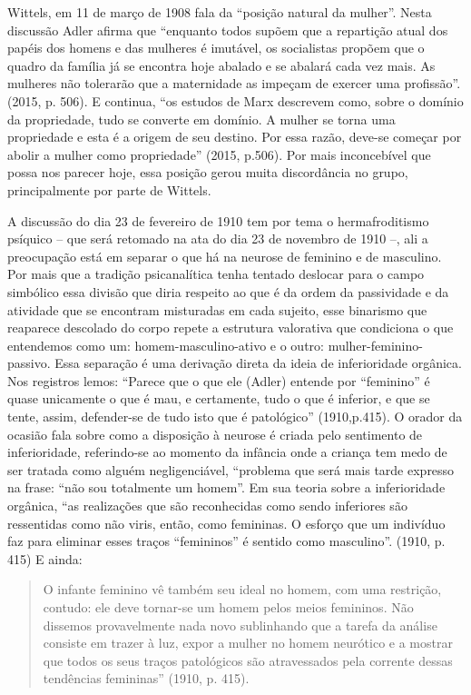 Wittels, em 11 de março de 1908 fala da ``posição natural da mulher''.
Nesta discussão Adler afirma que ``enquanto todos supõem que a repartição
atual dos papéis dos homens e das mulheres é imutável, os socialistas
propõem que o quadro da família já se encontra hoje abalado e se abalará
cada vez mais. As mulheres não tolerarão que a maternidade as impeçam de
exercer uma profissão''. (2015, p. 506). E continua, ``os estudos de Marx
descrevem como, sobre o domínio da propriedade, tudo se converte em
domínio. A mulher se torna uma propriedade e esta é a origem de seu
destino. Por essa razão, deve-se começar por abolir a mulher como
propriedade'' (2015, p.506). Por mais inconcebível que possa nos parecer
hoje, essa posição gerou muita discordância no grupo, principalmente por
parte de Wittels.

A discussão do dia 23 de fevereiro de 1910 tem por tema o
hermafroditismo psíquico -- que será retomado na ata do dia 23 de
novembro de 1910 --, ali a preocupação está em separar o que há na
neurose de feminino e de masculino. Por mais que a tradição
psicanalítica tenha tentado deslocar para o campo simbólico essa divisão
que diria respeito ao que é da ordem da passividade e da atividade que
se encontram misturadas em cada sujeito, esse binarismo que reaparece
descolado do corpo repete a estrutura valorativa que condiciona o que
entendemos como um: homem-masculino-ativo e o outro:
mulher-feminino-passivo. Essa separação é uma derivação direta da ideia
de inferioridade orgânica. Nos registros lemos: ``Parece que o que ele
(Adler) entende por ``feminino'' é quase unicamente o que é mau, e
certamente, tudo o que é inferior, e que se tente, assim, defender-se de
tudo isto que é patológico'' (1910,p.415). O orador da ocasião fala
sobre como a disposição à neurose é criada pelo sentimento de
inferioridade, referindo-se ao momento da infância onde a criança tem
medo de ser tratada como alguém negligenciável, ``problema que será mais
tarde expresso na frase: ``não sou totalmente um homem''. Em sua teoria
sobre a inferioridade orgânica, ``as realizações que são reconhecidas
como sendo inferiores são ressentidas como não viris, então, como
femininas. O esforço que um indivíduo faz para eliminar esses traços
``femininos'' é sentido como masculino''. (1910, p. 415) E ainda:

\begin{quote}
O infante feminino vê também seu ideal no homem, com uma restrição,
contudo: ele deve tornar-se um homem pelos meios femininos. Não dissemos
provavelmente nada novo sublinhando que a tarefa da análise consiste em
trazer à luz, expor a mulher no homem neurótico e a mostrar que todos os
seus traços patológicos são atravessados pela corrente dessas tendências
femininas'' (1910, p. 415).
\end{quote}

